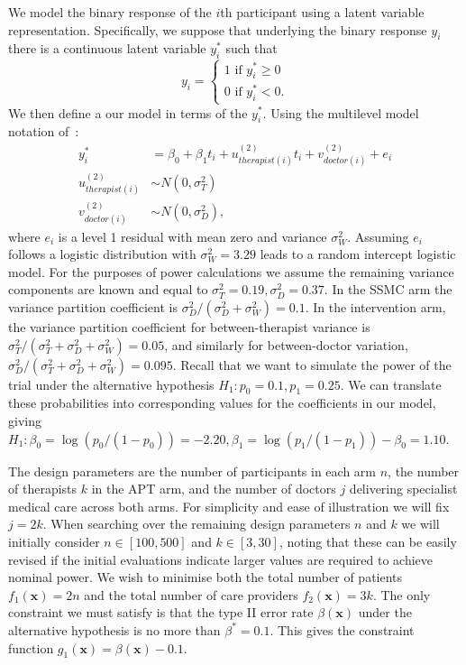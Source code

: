\documentclass{article} %
\begin{document}
We model the binary response of the $i$th participant using a latent variable representation. Specifically, we suppose that underlying the binary response $y_i$ there is a continuous latent variable $y_i^*$ such that
$$
y_i =
\begin{cases}
1 \text{ if } y_i^* \geq 0\\
0 \text{ if } y_i^* < 0.
\end{cases}
$$
We then define a our model in terms of the $y_i^*$. Using the multilevel model notation of~\cite{Goldstein2003}:
\begin{align}\label{eqn:ex1_model}
y_i^* &= \beta_{0} + \beta_1 t_i + u_{therapist(i)}^{(2)}t_{i} + v_{doctor(i)}^{(2)} + e_i \\
u_{therapist(i)}^{(2)} & \sim N(0, \sigma_T^2) \\
v_{doctor(i)}^{(2)} & \sim N(0, \sigma_D^2),
\end{align}
where $e_i$ is a level 1 residual with mean zero and variance $\sigma_W^2$. Assuming $e_i$ follows a logistic distribution with $\sigma_W^2 = 3.29$ leads to a random intercept logistic model. For the purposes of power calculations we assume the remaining variance components are known and equal to $\sigma_{T}^{2} = 0.19, \sigma_{D}^{2} = 0.37$. In the SSMC arm the variance partition coefficient is $\sigma_D^2 / (\sigma^2_D + \sigma^2_W) = 0.1$. In the intervention arm, the variance partition coefficient for between-therapist variance is $\sigma^2_T/(\sigma^2_T + \sigma^2_D + \sigma^2_W) = 0.05$, and similarly for between-doctor variation, $\sigma^2_D/(\sigma^2_T + \sigma^2_D + \sigma^2_W) = 0.095$. Recall that we want to simulate the power of the trial under the alternative hypothesis $H_1: p_0=0.1, p_1=0.25$. We can translate these probabilities into corresponding values for the coefficients in our model, giving $H_1: \beta_0 = \log(p_0/(1-p_0)) = -2.20, \beta_1 = \log(p_1/(1-p_1)) - \beta_0 = 1.10$.

The design parameters are the number of participants in each arm $n$, the number of therapists $k$ in the APT arm, and the number of doctors $j$ delivering specialist medical care across both arms. For simplicity and ease of illustration we will fix $j = 2k$. When searching over the remaining design parameters $n$ and $k$ we will initially consider $n \in [100, 500]$ and $k \in [3, 30]$, noting that these can be easily revised if the initial evaluations indicate larger values are required to achieve nominal power. We wish to minimise both the total number of patients $f_{1}(\mathbf{x}) = 2n$ and the total number of care providers $f_{2}(\mathbf{x}) = 3k$. The only constraint we must satisfy is that the type II error rate $\beta(\mathbf{x})$ under the alternative hypothesis is no more than $\beta^{*} = 0.1$. This gives the constraint function $g_{1}(\mathbf{x}) = \beta(\mathbf{x}) - 0.1$.
\end{document}
